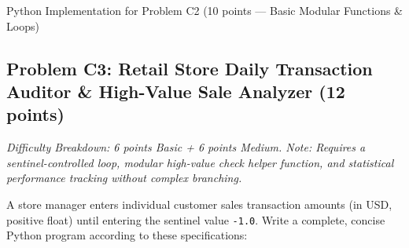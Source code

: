 \documentclass[11pt,a4paper]{article}
\begin{document}
\vspace{0.8mm}
\begin{answerbox}[height=18.0cm]{Python Implementation for Problem C2 (10 points --- Basic Modular Functions \& Loops)}
\end{answerbox}

\newpage


\subsection*{Problem C3: Retail Store Daily Transaction Auditor \& High-Value Sale Analyzer (12 points)}
\textit{Difficulty Breakdown: 6 points Basic + 6 points Medium. Note: Requires a sentinel-controlled loop, modular high-value check helper function, and statistical performance tracking without complex branching.}

A store manager enters individual customer sales transaction amounts (in USD, positive float) until entering the sentinel value \texttt{-1.0}. Write a complete, concise Python program according to these specifications:
\end{document}
